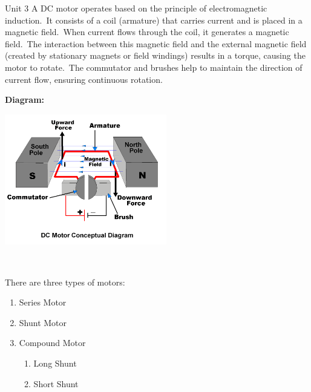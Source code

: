 \documentclass[11pt]{beamer}
\begin{document}
\begin{frame}[t,allowframebreaks]{Unit 3}
        A DC motor operates based on the principle of electromagnetic induction.\ It consists of a coil (armature)
        that carries current and is placed in a magnetic field.\ When current flows through the coil, it generates a
        magnetic field.\ The interaction between this magnetic field and the external magnetic field (created by
        stationary magnets or field windings) results in a torque, causing the motor to rotate.\ The commutator and
        brushes help to maintain the direction of current flow, ensuring continuous rotation.

        \framebreak

        \textbf{Diagram:}

        \begin{center}
            \includegraphics[width=200pt]{dc-motor-construction}
        \end{center}

        \framebreak

        \begin{center}
            \underline{}\\[10pt]%
        \end{center}

        There are three types of motors:

        \begin{enumerate}
            \item Series Motor
            \item Shunt Motor
            \item Compound Motor
            \begin{enumerate}
                \item Long Shunt
                \item Short Shunt
            \end{enumerate}
        \end{enumerate}


\end{frame}
\end{document}
